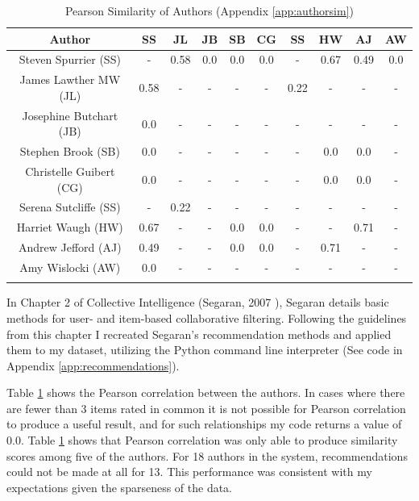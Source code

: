 \begin{table}[ht]
    \caption{Pearson Similarity of Authors (Appendix \ref{app:authorsim})}
    \centering
    \begin{tabular}{c c c c c c c c c c}
        \\\hline\hline
        Author                   & SS   & JL   & JB  & SB  & CG  & SS  & HW   & AJ   & AW
        \\\hline
        Steven Spurrier (SS)     & -    & 0.58 & 0.0 & 0.0 & 0.0 & -    & 0.67 & 0.49 & 0.0 \\
        James Lawther MW (JL)    & 0.58 & -    & -   & -   & -   & 0.22 & -    & -    & -   \\
        Josephine Butchart (JB)  & 0.0  & -    & -   & -   & -   & -    & -    & -    & -   \\
        Stephen Brook (SB)       & 0.0  & -    & -   & -   & -   & -    & 0.0  & 0.0  & -   \\
        Christelle Guibert (CG)  & 0.0  & -    & -   & -   & -   & -    & 0.0  & 0.0  & -   \\
        Serena Sutcliffe (SS)    & -    & 0.22 & -   & -   & -   & -    & -    & -    & -   \\
        Harriet Waugh (HW)       & 0.67 & -    & -   & 0.0 & 0.0 & -    & -    & 0.71 & -   \\
        Andrew Jefford (AJ)      & 0.49 & -    & -   & 0.0 & 0.0 & -    & 0.71 & -    & -   \\
        Amy Wislocki (AW)        & 0.0  & -    & -   & -   & -   & -    & -    & -    & -   \\
        \\\hline
    \end{tabular}
    \label{table:authormatrix}
\end{table}

In Chapter 2 of Collective Intelligence (Segaran, 2007 \cite{Segaran07}), Segaran details basic methods for user- and item-based collaborative filtering. Following the guidelines from this chapter I recreated Segaran's recommendation methods and applied them to my dataset, utilizing the Python command line interpreter (See code in Appendix \ref{app:recommendations}). 

Table \ref{table:authormatrix} shows the Pearson correlation between the authors. In cases where there are fewer than 3 items rated in common it is not possible for Pearson correlation to produce a useful result, and for such relationships my code returns a value of 0.0. Table \ref{table:authormatrix} shows that Pearson correlation was only able to produce similarity scores among five of the authors. For 18 authors in the system, recommendations could not be made at all for 13. This performance was consistent with my expectations given the sparseness of the data.


